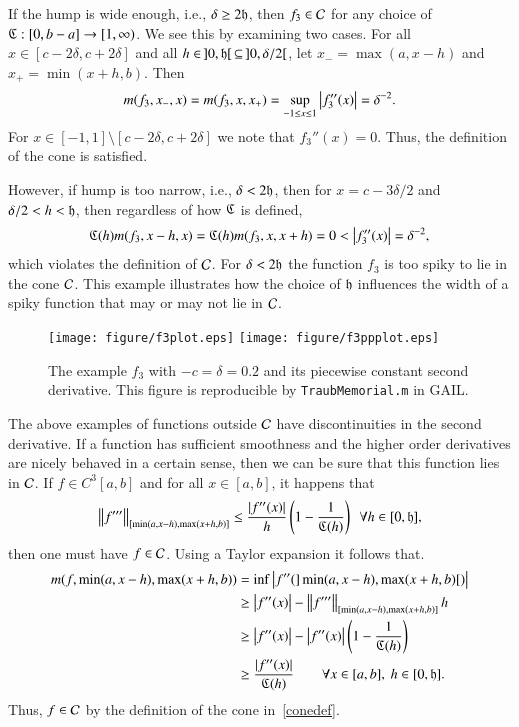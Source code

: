 \documentclass[review]{elsarticle}
\theoremstyle{definition}
\begin{document}
If the hump is wide enough, i.e., $\delta \ge 2 \fh$, then $f_3 \in \cc$ for
any choice of $\fC : [0,b-a] \to [1,\infty)$.  We see this by examining two cases.  For all $x \in [c - 2 \delta, c + 2 \delta]$ and all $h \in \, ]0,\fh[ \, \subseteq \, ]0,\delta/2[$, let $x_- = \max(a, x -h)$ and $x_+ = \min(x +h,b)$.  Then
\[
m(f_3,x_-,x) = m(f_3,x,x_+) = \sup_{-1 \le x \le 1} \abs{f_3''(x)}  = \delta^{-2}.
\]
For $x \in [-1,1] \setminus [c - 2 \delta , c + 2 \delta]$ we note that $f_3''(x) = 0$. Thus, the definition of the cone is satisfied.

However, if hump is too narrow, i.e.,  $\delta < 2 \fh$, then for $x = c-3\delta/2$ and $\delta/2 < h < \fh$, then regardless of how $\fC$ is defined,
\[
\fC(h)m(f_3,x - h,x)=\fC(h)m(f_3,x,x+h)=0 < \abs{f''_3(x)} = \delta^{-2},
\]
which violates the definition of $\cc$.  For $\delta < 2 \fh$ the function $f_3$ is too spiky to lie in the cone $\cc$.   This example illustrates how the choice of $\fh$ influences the width of
a spiky function that may or may not lie in $\cc$.

\begin{figure}[t]
\centering
\texttt{[image: figure/f3plot.eps]} \quad
\texttt{[image: figure/f3ppplot.eps]}
\caption{The example $f_3$ with $-c=\delta = 0.2$ and its piecewise constant
second derivative. This figure is reproducible by {\tt TraubMemorial.m} in
GAIL.}
\label{f3fig}
\end{figure}

The above examples of functions outside $\cc$ have discontinuities in the second
derivative.  If a function has sufficient smoothness and the higher order derivatives are nicely behaved in a certain sense, then we can be sure that this function lies in $\cc$.   If  $f \in C^3[a,b]$ and for all $x \in [a,b]$, it happens that
\begin{equation} \label{conesuffconda}
\norm[{[\min(a,x-h),\max(x+h,b)]}]{f'''} \le \frac{\abs{f''(x)}}{h} \left( 1 - \frac{1}{\fC(h)} \right) \ \ \forall h \in [0,\fh],
\end{equation}
then one must have $f \in \cc$.  Using a Taylor expansion it follows that.
\begin{align*}
m(f,\min(a,x-h),\max(x+h,b)) & = \inf \abs{f''(]\min(a,x-h),\max(x+h,b)[)} \\
& \ge \abs{f''(x)}  - \norm[{[\min(a,x-h),\max(x+h,b)]}]{f'''}h \\
& \ge \abs{f''(x)}  - \abs{f''(x)}\left( 1 - \frac{1}{\fC(h)} \right) \\
& \ge \frac{\abs{f''(x)}}{\fC(h)} \qquad \forall x \in [a,b],\ h \in [0,\fh].
\end{align*}
Thus, $f \in \cc$ by the definition of the cone in~\eqref{conedef}.
\end{document}
